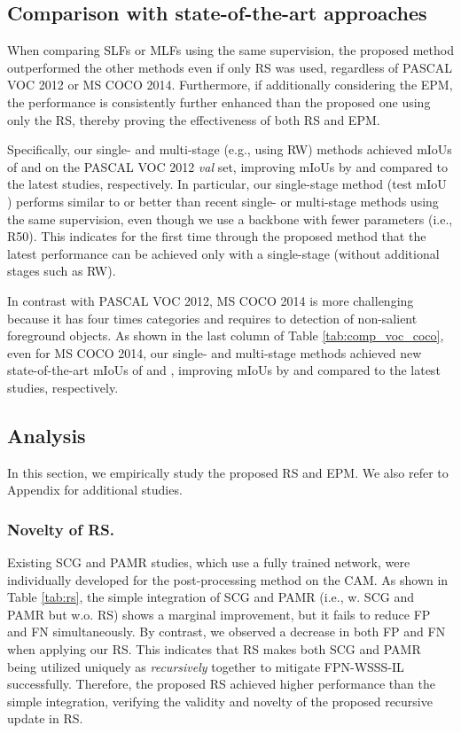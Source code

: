 \documentclass[11pt]{article}
\begin{document}
\subsection{Comparison with state-of-the-art approaches}
\label{ssec:results}

When comparing SLFs or MLFs using the same supervision, the proposed method outperformed the other methods even if only RS was used, regardless of PASCAL VOC 2012 or MS COCO 2014. Furthermore, if additionally considering the EPM, the performance is consistently further enhanced than the proposed one using only the RS, thereby proving the effectiveness of both RS and EPM.

Specifically, our single- and multi-stage (e.g., using RW) methods achieved mIoUs of  and  on the PASCAL VOC 2012 \emph{val} set, improving mIoUs by  and  compared to the latest studies, respectively.
In particular, our single-stage method (test mIoU ) performs similar to or better than recent single- or multi-stage methods  using the same supervision, even though we use a backbone with fewer parameters (i.e., R50). This indicates for the first time through the proposed method that the latest performance can be achieved only with a single-stage (without additional stages such as RW).

In contrast with PASCAL VOC 2012, MS COCO 2014 is more challenging because it has four times categories and requires to detection of non-salient foreground objects.  
As shown in the last column of Table \ref{tab:comp_voc_coco}, even for MS COCO 2014, our single- and multi-stage methods achieved new state-of-the-art mIoUs of  and , improving mIoUs by  and  compared to the latest studies, respectively.

\subsection{Analysis}
\label{section:disc}

In this section, we empirically study the proposed RS and EPM. We also refer to Appendix for additional studies. 

\subsubsection{Novelty of RS.} 
Existing SCG and PAMR studies, which use a fully trained network, were individually developed for the post-processing method on the CAM. As shown in Table \ref{tab:rs}, the simple integration of SCG and PAMR (i.e., w. SCG and PAMR but w.o. RS) shows a marginal improvement, but it fails to reduce FP and FN simultaneously. By contrast, we observed a decrease in both FP and FN when applying our RS. This indicates that RS makes both SCG and PAMR being utilized uniquely as \textit{recursively} together to mitigate FPN-WSSS-IL successfully. Therefore, the proposed RS achieved higher performance than the simple integration, verifying the validity and novelty of the proposed recursive update in RS.
\end{document}
